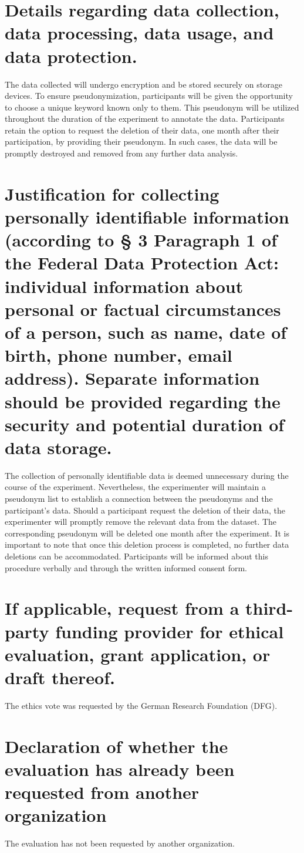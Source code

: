 \documentclass[letterpaper]{article}
\begin{document}
\section{Details regarding data collection, data processing, data usage, and data protection.}
The data collected will undergo encryption and be stored securely on storage devices. To ensure pseudonymization, participants will be given the opportunity to choose a unique keyword known only to them. This pseudonym will be utilized throughout the duration of the experiment to annotate the data. Participants retain the option to request the deletion of their data, one month after their participation, by providing their pseudonym. In such cases, the data will be promptly destroyed and removed from any further data analysis.

\section{Justification for collecting personally identifiable information (according to {\S} 3 Paragraph 1 of the
Federal Data Protection Act: individual information about personal or factual circumstances of a person, such as name,
date of birth, phone number, email address). Separate information should be provided regarding the security and
potential duration of data storage.}

The collection of personally identifiable data is deemed unnecessary during the course of the experiment. Nevertheless, the experimenter will maintain a pseudonym list to establish a connection between the pseudonyms and the participant's data. Should a participant request the deletion of their data, the experimenter will promptly remove the relevant data from the dataset. The corresponding pseudonym will be deleted one month after the experiment. It is important to note that once this deletion process is completed, no further data deletions can be accommodated. Participants will be informed about this procedure verbally and through the written informed consent form.

\section{If applicable, request from a third-party funding provider for ethical evaluation, grant application, or draft
thereof.}
The ethics vote was requested by the German Research Foundation (DFG).

\section{Declaration of whether the evaluation has already been requested from another organization}
The evaluation has not been requested by another organization.
\end{document}
